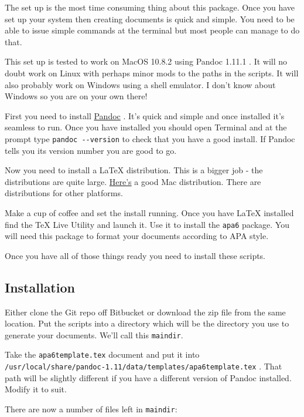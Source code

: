 \documentclass{easychair}
\begin{document}
The set up is the most time consuming thing about this package. Once you
have set up your system then creating documents is quick and simple. You
need to be able to issue simple commands at the terminal but most people
can manage to do that.

This set up is tested to work on MacOS 10.8.2 using Pandoc 1.11.1 . It
will no doubt work on Linux with perhaps minor mods to the paths in the
scripts. It will also probably work on Windows using a shell emulator. I
don't know about Windows so you are on your own there!

First you need to install
\href{http://johnmacfarlane.net/pandoc/installing.html}{Pandoc} . It's
quick and simple and once installed it's seamless to run. Once you have
installed you should open Terminal and at the prompt type
\texttt{pandoc -{}-version} to check that you have a good install. If
Pandoc tells you its version number you are good to go.

Now you need to install a LaTeX distribution. This is a bigger job - the
distributions are quite large. \href{http://tug.org/mactex/}{Here's} a
good Mac distribution. There are distributions for other platforms.

Make a cup of coffee and set the install running. Once you have LaTeX
installed find the TeX Live Utility and launch it. Use it to install the
\texttt{apa6} package. You will need this package to format your
documents according to APA style.

Once you have all of those things ready you need to install these
scripts.

\subsection{Installation}\label{installation}

Either clone the Git repo off Bitbucket or download the zip file from
the same location. Put the scripts into a directory which will be the
directory you use to generate your documents. We'll call this
\texttt{maindir}.

Take the \texttt{apa6template.tex} document and put it into
\texttt{/usr/local/share/pandoc-1.11/data/templates/apa6template.tex} .
That path will be slightly different if you have a different version of
Pandoc installed. Modify it to suit.

There are now a number of files left in \texttt{maindir}:
\end{document}
